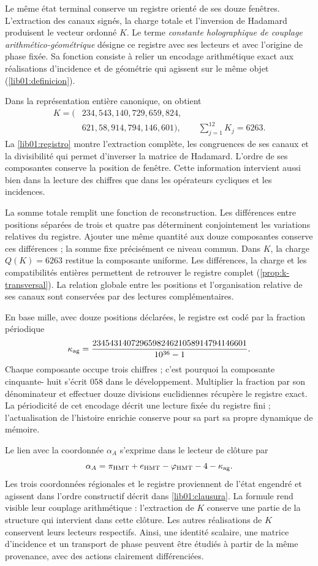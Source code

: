 Le même état terminal conserve un registre orienté de ses douze
fenêtres. L’extraction des canaux signés, la charge totale et
l’inversion de Hadamard produisent le vecteur ordonné \(K\). Le terme
\emph{constante holographique de couplage arithmético-géométrique}
désigne ce registre avec ses lecteurs et avec l’origine de phase fixée.
Sa fonction consiste à relier un encodage arithmétique exact
aux réalisations d’incidence et de géométrie qui agissent sur le
même objet (\cref{lib01:definicion}).

Dans la représentation entière canonique, on obtient
\[
 \begin{aligned}
 K=\bigl(&234,543,140,729,659,824,\\
         &621,58,914,794,146,601\bigr),
 \qquad\sum_{j=1}^{12}K_j=6263.
 \end{aligned}
\]
La \cref{lib01:registro} montre l'extraction complète, les congruences de ses canaux et la divisibilité qui permet d'inverser la matrice de Hadamard. L'ordre de ses composantes conserve la position de fenêtre. Cette information intervient aussi bien dans la lecture des chiffres que dans les opérateurs cycliques et les incidences.

La somme totale remplit une fonction de reconstruction. Les différences
entre positions séparées de trois et quatre pas déterminent
conjointement les variations relatives du registre. Ajouter une même
quantité aux douze composantes conserve ces différences ; la somme fixe
précisément ce niveau commun. Dans \(K\), la charge \(Q(K)=6263\)
restitue la composante uniforme. Les différences, la charge et les compatibilités
entières permettent de retrouver le registre complet
(\cref{prop:k-transversal}). La relation globale entre les positions et
l’organisation relative de ses canaux sont conservées par des lectures
complémentaires.

En base mille, avec douze positions déclarées, le registre est codé par la fraction périodique
\[
 \kappa_{\rm ag}=
 \frac{234543140729659824621058914794146601}{10^{36}-1}.
\]
Chaque composante occupe trois chiffres ; c’est pourquoi la composante cinquante-
huit s’écrit \(058\) dans le développement. Multiplier la fraction
par son dénominateur et effectuer douze divisions euclidiennes récupère le
registre exact. La périodicité de cet encodage décrit une
lecture fixée du registre fini ; l’actualisation de l’histoire
enrichie conserve pour sa part sa propre dynamique de mémoire.

Le lien avec la coordonnée \(\alpha_A\) s'exprime dans le lecteur de clôture par
\[
 \alpha_A=
 \pi_{\rm HMT}+e_{\rm HMT}-\varphi_{\rm HMT}-4-\kappa_{\rm ag}.
\]
Les trois coordonnées régionales et le registre proviennent de l'état engendré et agissent dans l'ordre constructif décrit dans \cref{lib01:clausura}. La formule rend visible leur couplage arithmétique : l'extraction de \(K\) conserve une partie de la structure qui intervient dans cette clôture. Les autres réalisations de \(K\) conservent leurs lecteurs respectifs. Ainsi, une identité scalaire, une matrice d'incidence et un transport de phase peuvent être étudiés à partir de la même provenance, avec des actions clairement différenciées.

